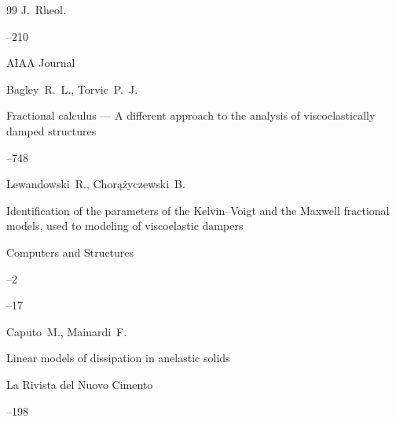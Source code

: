 \begin{thebibliography}{99}
\jour J.~Rheol.





--210







\jour  AIAA Journal

\by Bagley~R.~L., Torvic~P.~J.

\paper Fractional calculus --- A different approach to the analysis of viscoelastically damped structures




--748






\by Lewandowski~R., \Russian Chor\k{a}\.zyczewski~B.

\paper  Identification of the parameters of the Kelvin--Voigt and the Maxwell fractional models, used to modeling of viscoelastic dampers 

\jour Computers and Structures


--2


--17







\by Caputo~M., Mainardi~F.

\paper Linear models of dissipation in anelastic solids

\jour  La Rivista del Nuovo Cimento




--198






\end{thebibliography}
